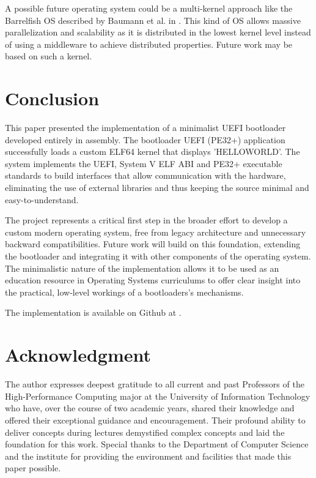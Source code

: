 \documentclass[conference]{IEEEtran}
\begin{document}
A possible future operating system could be a multi-kernel approach like the Barrelfish OS described by Baumann et al. in \cite{barrelfish}. This kind of OS allows massive parallelization and scalability as it is distributed in the lowest kernel level instead of using a middleware to achieve distributed properties. Future work may be based on such a kernel.

\section{Conclusion}
This paper presented the implementation of a minimalist UEFI bootloader developed entirely in assembly.
The bootloader UEFI (PE32+) application successfully loads a custom ELF64 kernel that displays 'HELLOWORLD'.
The system implements the UEFI, System V ELF ABI and PE32+ executable standards to build interfaces that allow communication with the hardware, eliminating the use of external libraries and thus keeping the source minimal and easy-to-understand.

The project represents a critical first step in the broader effort to develop a custom modern operating system, free from legacy architecture and unnecessary backward compatibilities.
Future work will build on this foundation, extending the bootloader and integrating it with other components of the operating system.
The minimalistic nature of the implementation allows it to be used as an education resource in Operating Systems curriculums to offer clear insight into the practical, low-level workings of a bootloaders's mechanisms.

The implementation is available on Github at \cite{mygithub}. 

\section*{Acknowledgment}

The author expresses deepest gratitude to all current and past Professors of the High-Performance Computing major at the University of Information Technology who have, over the course of two academic years, shared their knowledge and offered their exceptional guidance and encouragement. Their profound ability to deliver concepts during lectures demystified complex concepts and laid the foundation for this work. Special thanks to the Department of Computer Science and the institute for providing the environment and facilities that made this paper possible.


\end{document}
